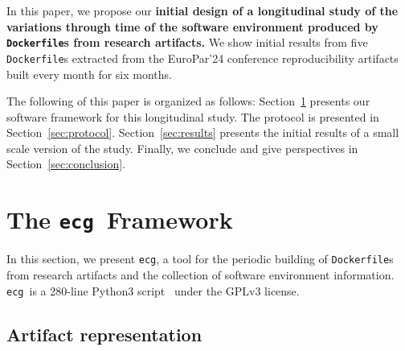 \documentclass[sigconf,natbib=false]{acmart}
\newcommand{\df}{\texttt{Dockerfile}}
\newcommand{\ecg}{\texttt{ecg}}
\newcommand{\todo}[1]{{\color{red}{TODO: #1}}}
\begin{document}
In this paper, we propose our \textbf{initial design of a longitudinal study of the variations through time of the software environment produced by \df s from research artifacts.}
We show initial results from five \df s extracted from the EuroPar'24 conference reproducibility artifacts built every month for six months.

% 

The following of this paper is organized as follows:
Section~\ref{sec:ecg} presents our software framework for this longitudinal study.
The protocol is presented in Section~\ref{sec:protocol}.
Section~\ref{sec:results} presents the initial results of a small scale version of the study.
Finally, we conclude and give perspectives in Section~\ref{sec:conclusion}.

\section{The \ecg\ Framework}\label{sec:ecg}


In this section, we present \ecg, a tool for the periodic building of \df s from research artifacts and the collection of software environment information.
\ecg\ is a 280-line Python3 script~\cite{ecg} under the GPLv3 license.

\subsection{Artifact representation}\label{sec:nickel}
\end{document}
